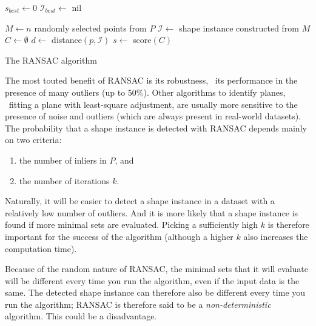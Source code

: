 \begin{algorithm}
	$s_{best} \leftarrow 0$\;
	$\mathcal{I}_{best} \leftarrow$ nil\;

	{
		$M \leftarrow n$ randomly selected points from $P$\;
		$\mathcal{I} \leftarrow$ shape instance constructed from $M$\;
		$C \leftarrow \emptyset$ \;
		{
			$d \leftarrow$ distance$(p,\mathcal{I})$\;
		}
		$s \leftarrow$ score$(C)$\;
	}
	\caption{The RANSAC algorithm}%
\label{algo:ransac}
\end{algorithm}




The most touted benefit of RANSAC is its robustness, \ie\ its performance in the presence of many outliers (up to 50\%). 
Other algorithms to identify planes, \eg\ fitting a plane with least-square adjustment, are usually more sensitive to the presence of noise and outliers (which are always present in real-world datasets).
The probability that a shape instance is detected with RANSAC depends mainly on two criteria:
\begin{enumerate}
	\item the number of inliers in $P$, and
	\item the number of iterations $k$.
\end{enumerate}
Naturally, it will be easier to detect a shape instance in a dataset with a relatively low number of outliers.
And it is more likely that a shape instance is found if more minimal sets are evaluated.
Picking a sufficiently high $k$ is therefore important for the success of the algorithm (although a higher $k$ also increases the computation time).

Because of the random nature of RANSAC, the minimal sets that it will evaluate will be different every time you run the algorithm, even if the input data is the same.
The detected shape instance can therefore also be different every time you run the algorithm; RANSAC is therefore said to be a \emph{non-deterministic} algorithm.
This could be a disadvantage.

